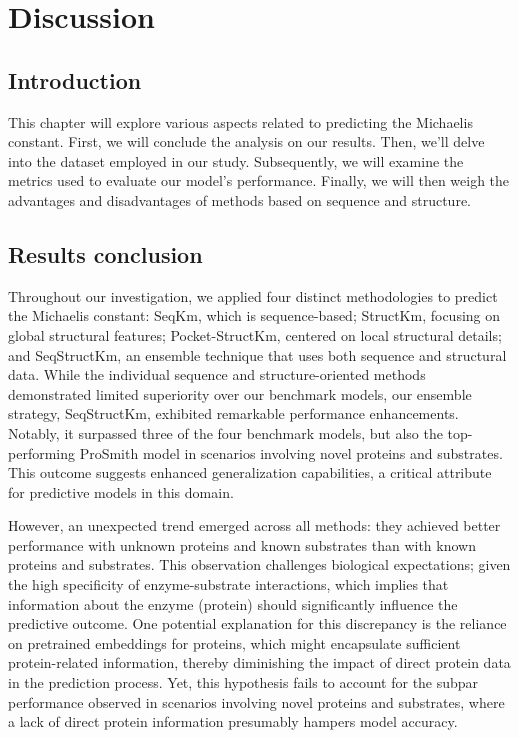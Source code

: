 
\chapter{Discussion}
\label{chap:6}

\section{Introduction}

This chapter will explore various aspects related to predicting the Michaelis constant. First, we will conclude the analysis on our results. Then, we'll delve into the dataset employed in our study. Subsequently, we will examine the metrics used to evaluate our model's performance. Finally, we will then weigh the advantages and disadvantages of methods based on sequence and structure.

\section{Results conclusion}
Throughout our investigation, we applied four distinct methodologies to predict the Michaelis constant: SeqKm, which is sequence-based; StructKm, focusing on global structural features; Pocket-StructKm, centered on local structural details; and SeqStructKm, an ensemble technique that uses both sequence and structural data. While the individual sequence and structure-oriented methods demonstrated limited superiority over our benchmark models, our ensemble strategy, SeqStructKm, exhibited remarkable performance enhancements. Notably, it surpassed three of the four benchmark models, but also the top-performing ProSmith model in scenarios involving novel proteins and substrates. This outcome suggests enhanced generalization capabilities, a critical attribute for predictive models in this domain.

However, an unexpected trend emerged across all methods: they achieved better performance with unknown proteins and known substrates than with known proteins and substrates. This observation challenges biological expectations; given the high specificity of enzyme-substrate interactions, which implies that information about the enzyme (protein) should significantly influence the predictive outcome. One potential explanation for this discrepancy is the reliance on pretrained embeddings for proteins, which might encapsulate sufficient protein-related information, thereby diminishing the impact of direct protein data in the prediction process. Yet, this hypothesis fails to account for the subpar performance observed in scenarios involving novel proteins and substrates, where a lack of direct protein information presumably hampers model accuracy.

